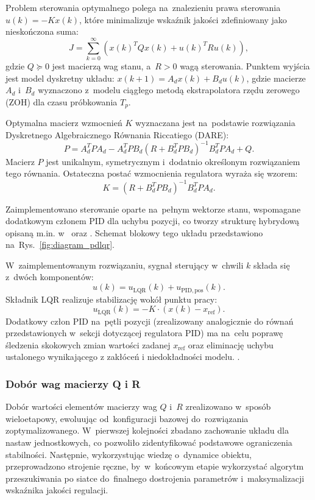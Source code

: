 Problem sterowania optymalnego polega na~znalezieniu prawa sterowania 
$u(k) = -K x(k)$, które minimalizuje wskaźnik jakości zdefiniowany jako nieskończona suma:
\begin{equation}
    J = \sum_{k=0}^{\infty} \left( x(k)^T Q x(k) + u(k)^T R u(k) \right),
\end{equation}
gdzie $Q \succeq 0$ jest macierzą wag stanu, a~$R > 0$ wagą sterowania. 
Punktem wyjścia jest model dyskretny układu: $x(k+1) = A_d x(k) + B_d u(k)$, 
gdzie macierze $A_d$ i~$B_d$ wyznaczono z~modelu ciągłego metodą ekstrapolatora 
rzędu zerowego (ZOH) dla czasu próbkowania $T_p$.

Optymalna macierz wzmocnień $K$ wyznaczana jest na~podstawie rozwiązania 
Dyskretnego Algebraicznego Równania Riccatiego (DARE):
\begin{equation}
    P = A_d^T P A_d - A_d^T P B_d \left( R + B_d^T P B_d \right)^{-1} B_d^T P A_d + Q.
\end{equation}
Macierz $P$ jest unikalnym, symetrycznym i~dodatnio określonym rozwiązaniem tego równania. 
Ostateczna postać wzmocnienia regulatora wyraża się wzorem:
\begin{equation}
    K = \left( R + B_d^T P B_d \right)^{-1} B_d^T P A_d.
\end{equation}

Zaimplementowano sterowanie oparte na~pełnym wektorze stanu, 
wspomagane dodatkowym członem PID dla uchybu pozycji, co tworzy strukturę hybrydową 
opisaną m.in. w~\cite{Prasad2014} oraz \cite{Nguyen2024}. 
Schemat blokowy tego układu przedstawiono na~Rys.~\ref{fig:diagram_pdlqr}.

W~zaimplementowanym rozwiązaniu, sygnał sterujący w~chwili $k$
składa się z~dwóch komponentów:
\begin{equation}
    u(k) = u_{\mathrm{LQR}}(k) + u_{\mathrm{PID,pos}}(k).
\end{equation}
Składnik LQR realizuje stabilizację wokół punktu pracy:
\begin{equation}
    u_{\mathrm{LQR}}(k) = -K \cdot (x(k) - x_{\mathrm{ref}}).
\end{equation}
Dodatkowy człon PID na~pętli pozycji (zrealizowany analogicznie do równań przedstawionych w~sekcji dotyczącej regulatora PID) 
ma na~celu poprawę śledzenia skokowych zmian wartości zadanej
$x_{\mathrm{ref}}$ oraz eliminację uchybu ustalonego wynikającego z zakłóceń i niedokładności modelu.
\cite{Prasad2014}.

\subsubsection{Dobór wag macierzy Q i R}
Dobór wartości elementów macierzy wag $Q$ i~$R$ zrealizowano w~sposób
wieloetapowy, ewoluując od~konfiguracji bazowej do~rozwiązania
zoptymalizowanego. W~pierwszej kolejności zbadano zachowanie układu dla nastaw
jednostkowych, co pozwoliło zidentyfikować podstawowe ograniczenia stabilności.
Następnie, wykorzystując wiedzę o~dynamice obiektu, przeprowadzono strojenie
ręczne, by~w~końcowym etapie wykorzystać algorytm przeszukiwania po siatce do~finalnego
dostrojenia parametrów i~maksymalizacji wskaźnika jakości regulacji.

